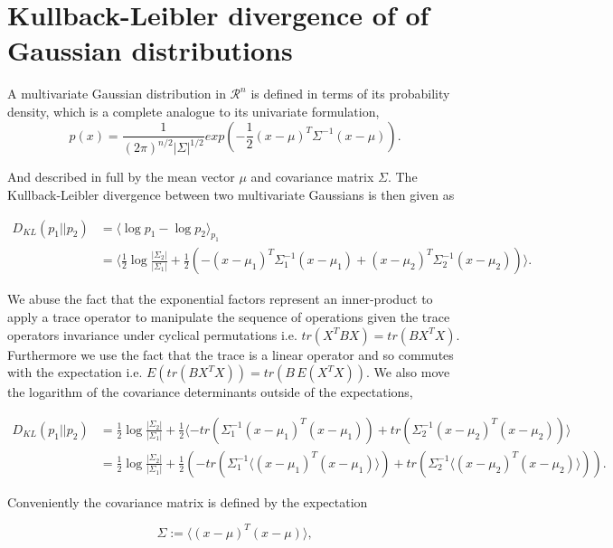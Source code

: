 \chapter{Kullback-Leibler divergence of of Gaussian distributions}\label{appendix:kl_gauss}

A multivariate Gaussian distribution in $\mathcal{R}^n$ is defined in terms of its probability density, which is a complete analogue to its univariate formulation, 
\begin{equation}\label{eq:multi_gauss}
p(x) = \frac{1}{(2\pi)^{n/2}|\Sigma|^{1/2}}exp(-\frac{1}{2}(x- \mu)^T\Sigma^{-1}(x-\mu)).
\end{equation}

\noindent And described in full by the mean vector $\mu$ and covariance matrix $\Sigma$. The  Kullback-Leibler divergence between two multivariate Gaussians is then given as 

\begin{align*}
D_{KL}(p_1|| p_2 ) &= \langle \log p_1 - \log p_2 \rangle_{p_1} \\
&= \langle \frac{1}{2}\log \frac{|\Sigma_2|}{|\Sigma_1|} + \frac{1}{2} (-(x- \mu_1)^T\Sigma_1^{-1}(x-\mu_1) + (x- \mu_2)^T\Sigma_2^{-1}(x-\mu_2))   \rangle.
\end{align*}

\noindent We abuse the fact that the exponential factors represent an inner-product to apply a trace operator to manipulate the sequence of operations given the trace operators invariance under cyclical permutations i.e. $tr(X^TBX) = tr(BX^TX)$. Furthermore we use the fact that the trace is a linear operator and so commutes with the expectation i.e. $E(tr(BX^TX)) = tr(B\, E(X^TX))$. We also move the logarithm of the covariance determinants outside of the expectations, 

\begin{align*}
D_{KL}(p_1|| p_2 ) &= \frac{1}{2}\log \frac{|\Sigma_2|}{|\Sigma_1|} + \frac{1}{2} \langle - tr(\Sigma^{-1}_1(x-\mu_1)^T(x-\mu_1)) + tr(\Sigma^{-1}_2(x-\mu_2)^T(x-\mu_2))\rangle \\
&= \frac{1}{2}\log \frac{|\Sigma_2|}{|\Sigma_1|} + \frac{1}{2} (- tr(\Sigma^{-1}_1\langle(x-\mu_1)^T(x-\mu_1)\rangle) + tr(\Sigma^{-1}_2\langle(x-\mu_2)^T(x-\mu_2)\rangle)).
\end{align*}

\noindent Conveniently the covariance matrix is defined by the expectation 

\begin{equation}
\Sigma := \langle (x-\mu)^T(x-\mu)\rangle, 
\end{equation}

